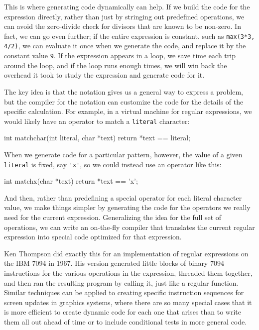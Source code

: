 This is where generating code dynamically can help. If we build the code
for the expression directly, rather than just by stringing out predefined
operations, we can avoid the zero-divide check for divisors that are known
to be non-zero. In fact, we can go even further; if the entire expression
is constant. such as \verb'max(3*3, 4/2)', we can evaluate it once when we
generate the code, and replace it by the constant value \verb'9'.  If the
expression appears in a loop, we save time each trip around the loop, and
if the loop runs enough times, we will win back the overhead it took to
study the expression and generate code for it.

The key idea is that the notation gives us a general way to express a
problem, but the compiler for the notation can customize the code for the
details of the specific calculation. For example, in a virtual machine for
regular expressions, we would likely have an operator to match a
\verb'literal' character:
\begin{wellcode}
    int matchchar(int literal, char *text)
    {
        return *text == literal;
    }
\end{wellcode}
When we generate code for a particular pattern, however, the value of a
given \verb'literal' is fixed, say \verb"'x'", so we could instead use an
operator like this:
\begin{wellcode}
    int matchx(char *text)
    {
        return *text == 'x';
    }
\end{wellcode}
And then, rather than predefining a special operator for each literal
character value, we make things simpler by generating the code for the
operators we really need for the current expression. Generalizing the idea
for the full set of operations, we can write an on-the-fly compiler that
translates the current regular expression into special code optimized for
that expression.

Ken Thompson did exactly this for an implementation of regular expressions
on the IBM 7094 in 1967. His version generated little blocks of binary 7094
instructions for the various operations in the expression, threaded them
together, and then ran the resulting program by calling it, just like a
regular function. Similar techniques can be applied to creating specific
instruction sequences for screen updates in graphics systems, where there
are so many special cases that it is more efficient to create dynamic code
for each one that arises than to write them all out ahead of time or to
include conditional tests in more general code.


